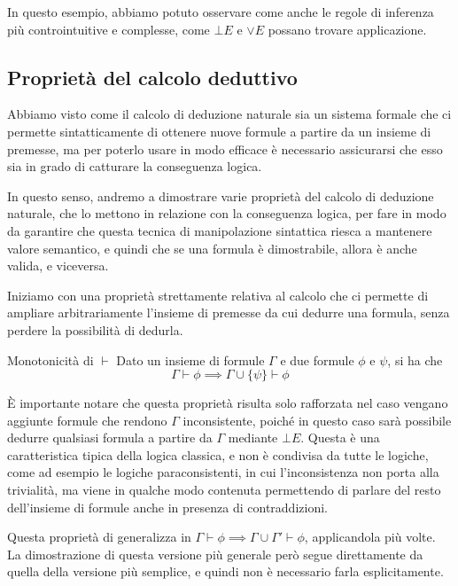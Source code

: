 In questo esempio, abbiamo potuto osservare come anche le regole di inferenza più controintuitive e complesse, come \(\bot E\) e \(\lor E\) possano trovare applicazione.

\subsection{Proprietà del calcolo deduttivo}

Abbiamo visto come il calcolo di deduzione naturale sia un sistema formale che ci permette sintatticamente di ottenere nuove formule a partire da un insieme di premesse, ma per poterlo usare in modo efficace è necessario assicurarsi che esso sia in grado di catturare la conseguenza logica.

In questo senso, andremo a dimostrare varie proprietà del calcolo di deduzione naturale, che lo mettono in relazione con la conseguenza logica, per fare in modo da garantire che questa tecnica di manipolazione sintattica riesca a mantenere valore semantico, e quindi che se una formula è dimostrabile, allora è anche valida, e viceversa.

Iniziamo con una proprietà strettamente relativa al calcolo che ci permette di ampliare arbitrariamente l'insieme di premesse da cui dedurre una formula, senza perdere la possibilità di dedurla.

\begin{theorem}[namedlabel={thm:monotonicity}{Monotonicità}]{Monotonicità di \(\vdash\)}
  Dato un insieme di formule \(\Gamma\) e due formule \(\phi\) e \(\psi\), si ha che
  \[\Gamma \vdash \phi \implies \Gamma \cup \{\psi\} \vdash \phi\]
\end{theorem}

È importante notare che questa proprietà risulta solo rafforzata nel caso vengano aggiunte formule che rendono \(\Gamma\) inconsistente, poiché in questo caso sarà possibile dedurre qualsiasi formula a partire da \(\Gamma\) mediante \(\bot E\). Questa è una caratteristica tipica della logica classica, e non è condivisa da tutte le logiche, come ad esempio le logiche paraconsistenti, in cui l'inconsistenza non porta alla trivialità, ma viene in qualche modo contenuta permettendo di parlare del resto dell'insieme di formule anche in presenza di contraddizioni.

\begin{note}{}
  Questa proprietà di generalizza in \(\Gamma \vdash \phi \implies \Gamma \cup \Gamma' \vdash \phi\), applicandola più volte. La dimostrazione di questa versione più generale però segue direttamente da quella della versione più semplice, e quindi non è necessario farla esplicitamente.
\end{note}

